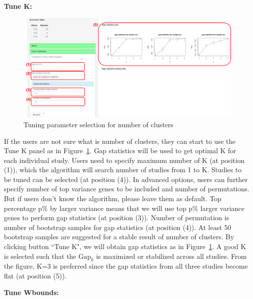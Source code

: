 \begin{steps}

\item \textbf{Tune K:} 

\begin{figure}[H]
\begin{center}
\includegraphics[scale=0.5]{./figure/metaClust/tuneK.pdf}
\caption{Tuning parameter selection for number of clusters}
\label{fig:metaClusttuneK}
\end{center}
\end{figure}

If the users are not sure what is number of clusters,
they can start to use the Tune K panel as in Figure~\ref{fig:metaClusttuneK}.
Gap statistics will be used to get optimal K for each individual study.
Users need to specify maximum number of K (at position {\color{red} (1)}), which the algorithm will search number of studies from 1 to K.
Studies to be tuned can be selected (at position {\color{red} (4)}).
In advanced options, users can further specify number of top variance genes to be included and number of permutations.
But if users don't know the algorithm, please leave them as default.
Top percentage p\% by larger variance means that we will use top p\% larger variance genes to perform gap statistics (at position {\color{red} (3)}).
Number of permutation is number of bootstrap samples for gap statistics (at position {\color{red} (4)}).
At least 50 bootstrap samples are suggested for a stable result of number of clusters.
By clicking button ``Tune K",
we will obtain gap statistics as in Figure~\ref{fig:metaClusttuneK}.
A good K is selected such that the $\mbox{Gap}_k$ is maximized or stabilized across all studies.
From the figure, K=3 is preferred since the gap statistics from all three studies become flat (at position {\color{red} (5)}).

\item \textbf{Tune Wbounds:} 


\end{steps}
